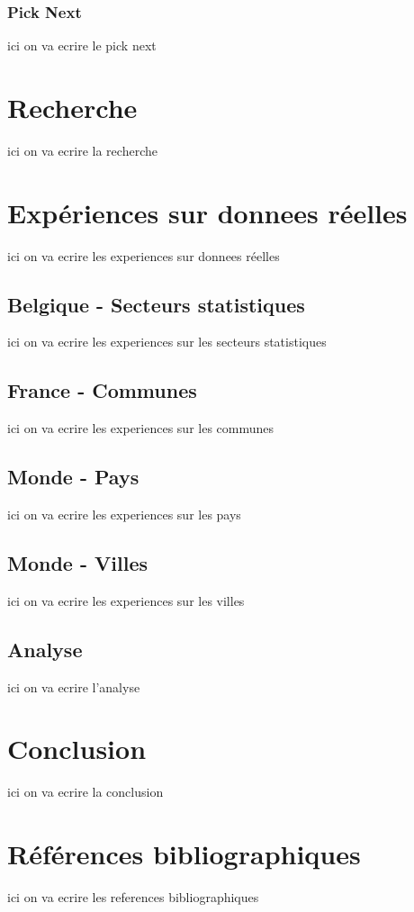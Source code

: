\documentclass {article}
\begin{document}
\subsubsection {Pick Next}
ici on va ecrire le pick next

\section {Recherche}\label{recherche}
ici on va ecrire la recherche

\section {Expériences sur donnees réelles}
ici on va ecrire les experiences sur donnees réelles

\subsection {Belgique - Secteurs statistiques}
ici on va ecrire les experiences sur les secteurs statistiques

\subsection {France - Communes}
ici on va ecrire les experiences sur les communes

\subsection {Monde - Pays}
ici on va ecrire les experiences sur les pays

\subsection {Monde - Villes}
ici on va ecrire les experiences sur les villes

\subsection {Analyse}
ici on va ecrire l'analyse

\section {Conclusion}
ici on va ecrire la conclusion

\section {Références bibliographiques}
ici on va ecrire les references bibliographiques
\end{document}

